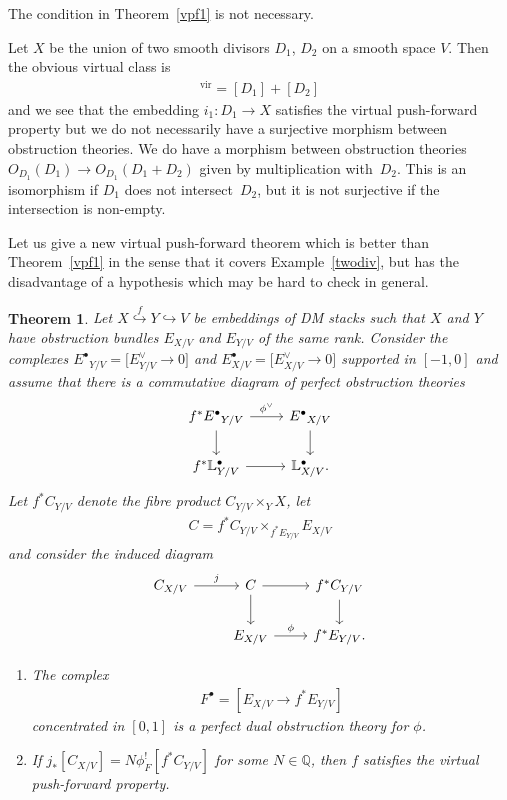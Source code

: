 \documentclass[pdftex]{sigma}
\numberwithin{equation}{section}
\newtheorem{Theorem}{Theorem}[section]
\newcommand{\vv}{\mathrm{vir}}
\begin{document}
The condition in Theorem~\ref{vpf1} is not necessary.
\begin{Example}\label{twodiv} Let $X$ be the union of two smooth divisors $D_1$, $D_2$ on a smooth space $V$. Then the obvious virtual class is \begin{gather*}[X]^{\vv}=[D_1]+[D_2]\end{gather*} and we see that the embedding $i_1\colon D_1\to X$ satisfies the virtual push-forward property but we do not necessarily have a surjective morphism between obstruction theories. We do have a morphism between obstruction theories $O_{D_1}(D_1)\to O_{D_1}(D_1+D_2)$ given by multiplication with~$D_2$. This is an isomorphism if $D_1$ does not intersect~$D_2$, but it is not surjective if the intersection is non-empty.
\end{Example}

Let us give a new virtual push-forward theorem which is better than Theorem~\ref{vpf1} in the sense that it covers Example~\ref{twodiv}, but has the disadvantage of a hypothesis which may be hard to check in general.
\begin{Theorem}\label{vpfnew}
 Let $X\stackrel{f}{\hookrightarrow} Y\hookrightarrow V$ be embeddings of DM stacks such that $X$ and $Y$ have obstruction bundles $E_{X/V}$ and $E_{Y/V}$ of the same rank. Consider the complexes ${E^\bullet}_{Y/V}=\big[E^\vee_{Y/V}\to 0\big]$ and $E^{\bullet}_{X/V}=\big[E^\vee_{X/V}\to 0\big]$ supported in $[-1,0]$ and assume that there is a commutative diagram of perfect obstruction theories
 \begin{equation*}
 \begin{tikzcd}
 f^*{E^{\bullet}}_{Y/V}\ar[r,"{\phi^\vee}"]\ar[d] & {E^{\bullet}}_{X/V} \ar[d] \\
 f^*\mathbb L^\bullet_{Y/V}\ar[r] & \mathbb L^\bullet_{X/V} .
 \end{tikzcd}
 \end{equation*}
Let $f^*C_{Y/V}$ denote the fibre product $C_{Y/V}\times_YX$, let \begin{gather*}C=f^*C_{Y/V}\times_{f^*E_{Y/V}}E_{X/V}\end{gather*} and consider the induced diagram
\[
\begin{tikzcd}
C_{X/V}\ar[r,"j"] & C\ar[r]\ar[d] & f^*C_{Y/V}\ar[d] \\
 & E_{X/V}\ar[r,"\phi"] & f^*E_{Y/V}.
 \end{tikzcd}\]
\begin{enumerate}\itemsep=0pt
\item[$1.$] The complex \begin{gather*}F^\bullet=[E_{X/V}\to f^*E_{Y/V}]\end{gather*} concentrated in $[0,1]$ is a perfect dual obstruction theory for $\phi$.
\item[$2.$] If $j_*[C_{X/V}]=N\phi_F^![f^*C_{Y/V}]$ for some $N\in\mathbb Q$, then $f$ satisfies the virtual push-forward property.
\end{enumerate}
\end{Theorem}
\end{document}

